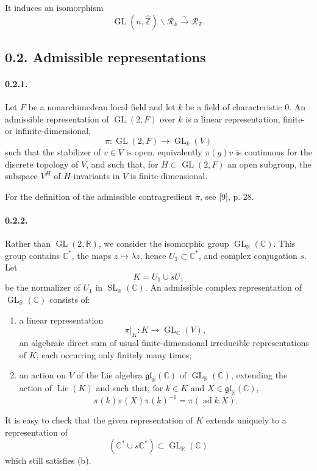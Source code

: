 \documentclass[10pt,a4paper]{article}
\providecommand{\GL}{\operatorname{GL}}
\providecommand{\SL}{\operatorname{SL}}
\providecommand{\Lie}{\operatorname{Lie}}
\providecommand{\R}{\mathbb R}
\providecommand{\Z}{\mathbb Z}
\providecommand{\C}{\mathbb C}
\providecommand{\A}{\mathbb A}
\providecommand{\calR}{\mathcal R}
\providecommand{\iso}{\xrightarrow{\sim}}
\begin{document}
\clearpage
{}
\hypertarget{authority-7}{}
It induces an isomorphism
\[
\tag{0.1.4.2}
\GL(n,\widehat{\Z})\backslash\calR_{\A}\iso\calR_{\Z}.
\]

\subsection*{0.2. Admissible representations}

\paragraph{0.2.1.} Let $F$ be a nonarchimedean local field and let $k$ be a field of characteristic $0$. An admissible representation of $\GL(2,F)$ over $k$ is a linear representation, finite- or infinite-dimensional,
\[
\pi:\GL(2,F)\longrightarrow\GL_k(V)
\]
such that the stabilizer of $v\in V$ is open, equivalently $\pi(g)v$ is continuous for the discrete topology of $V$, and such that, for $H\subset\GL(2,F)$ an open subgroup, the subspace $V^H$ of $H$-invariants in $V$ is finite-dimensional.

For the definition of the admissible contragredient $\check\pi$, see [9], p. 28.

\paragraph{0.2.2.} Rather than $\GL(2,\R)$, we consider the isomorphic group $\GL_{\R}(\C)$. This group contains $\C^*$, the maps $z\mapsto\lambda z$, hence $U_1\subset\C^*$, and complex conjugation $s$. Let
\[
K=U_1\cup sU_1
\]
be the normalizer of $U_1$ in $\SL_{\R}(\C)$. An admissible complex representation of $\GL_{\R}(\C)$ consists of:
\begin{enumerate}[label=(\alph*)]
\item a linear representation
\[
\pi|_K:K\longrightarrow\GL_{\C}(V),
\]
an algebraic direct sum of usual finite-dimensional irreducible representations of $K$, each occurring only finitely many times;
\item an action on $V$ of the Lie algebra $\mathfrak{gl}_{\R}(\C)$ of $\GL_{\R}(\C)$, extending the action of $\Lie(K)$ and such that, for $k\in K$ and $X\in\mathfrak{gl}_{\R}(\C)$,
\[
\tag{0.2.2.1}
\pi(k)\pi(X)\pi(k)^{-1}=\pi(\operatorname{ad}k.X).
\]
\end{enumerate}
It is easy to check that the given representation of $K$ extends uniquely to a representation of
\[
(\C^*\cup s\C^*)\subset\GL_{\R}(\C)
\]
which still satisfies (b).
\end{document}
